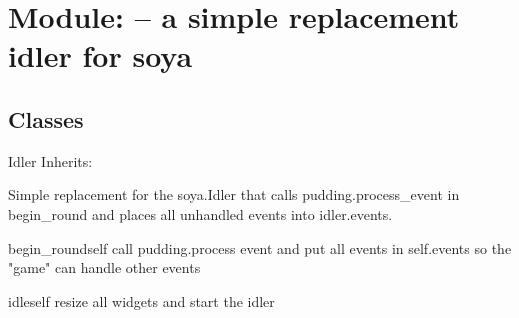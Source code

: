 \section{Module:  -- a simple replacement idler for soya}
\subsection{Classes}
\begin{classdesc*}{Idler}
Inherits:

Simple replacement for the soya.Idler that calls pudding.process\_event
in begin\_round and places all unhandled events into idler.events.

\begin{methoddesc}{begin_round}{self}
call pudding.process event and put all events in self.events so the 
"game" can handle other events
\end{methoddesc}

\begin{methoddesc}{idle}{self}
resize all widgets and start the idler
\end{methoddesc}

\end{classdesc*}

